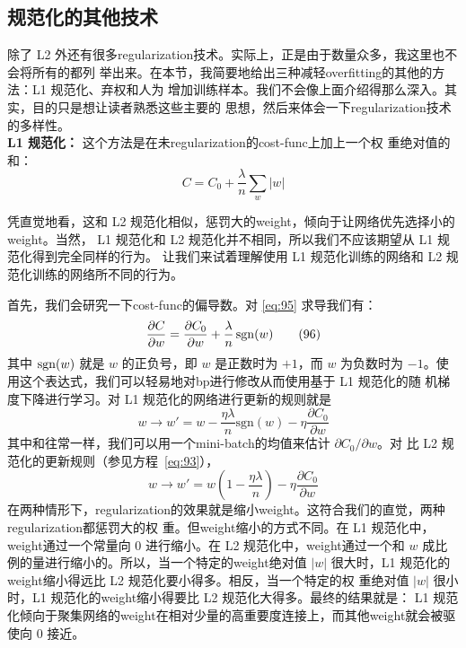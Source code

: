 \subsection{规范化的其他技术}

除了 L2 外还有很多\gls*{regularization}技术。实际上，正是由于数量众多，我这里也不会将所有的都列
举出来。在本节，我简要地给出三种减轻\gls*{overfitting}的其他的方法：L1 规范化、弃权和人为
增加训练样本。我们不会像上面介绍得那么深入。其实，目的只是想让读者熟悉这些主要的
思想，然后来体会一下\gls*{regularization}技术的多样性。\\

\textbf{L1 规范化：} 这个方法是在未\gls*{regularization}的\gls*{cost-func}上加上一个权
重绝对值的和：
\begin{equation}
  C = C_0 + \frac{\lambda}{n} \sum_w |w|
  \label{eq:95}\tag{95}
\end{equation}

凭直觉地看，这和 L2 规范化相似，惩罚大的\gls*{weight}，倾向于让网络优先选择小的\gls*{weight}。当然，
L1 规范化和 L2 规范化并不相同，所以我们不应该期望从 L1 规范化得到完全同样的行为。
让我们来试着理解使用 L1 规范化训练的网络和 L2 规范化训练的网络所不同的行为。

首先，我们会研究一下\gls*{cost-func}的偏导数。对 \eqref{eq:95} 求导我们有：
\begin{equation}
  \frac{\partial C}{\partial w} = \frac{\partial C_0}{\partial w}
  + \frac{\lambda}{n} \, {\rm sgn}(w)
  \label{eq:96}\tag{96}
\end{equation}
其中 ${\rm sgn}(w)$ 就是 $w$ 的正负号，即 $w$ 是正数时为 $+1$，而 $w$ 为负数时为
$-1$。使用这个表达式，我们可以轻易地对\gls*{bp}进行修改从而使用基于 L1 规范化的随
机梯度下降进行学习。对 L1 规范化的网络进行更新的规则就是
\begin{equation}
  w \rightarrow w' = w-\frac{\eta \lambda}{n} \mbox{sgn}(w) - \eta \frac{\partial
  C_0}{\partial w}
  \label{eq:97}\tag{97}
\end{equation}
其中和往常一样，我们可以用一个\gls*{mini-batch}的均值来估计 $\partial C_0/\partial w$。对
比 L2 规范化的更新规则（参见方程~\eqref{eq:93}），
\begin{equation}
  w \rightarrow w' = w\left(1 - \frac{\eta \lambda}{n} \right)
  - \eta \frac{\partial C_0}{\partial w}
  \label{eq:98}\tag{98}
\end{equation}
在两种情形下，\gls*{regularization}的效果就是缩小\gls*{weight}。这符合我们的直觉，两种\gls*{regularization}都惩罚大的权
重。但\gls*{weight}缩小的方式不同。在 L1 规范化中，\gls*{weight}通过一个常量向 $0$ 进行缩小。在 L2
规范化中，\gls*{weight}通过一个和 $w$ 成比例的量进行缩小的。所以，当一个特定的\gls*{weight}绝对值
$|w|$ 很大时，L1 规范化的\gls*{weight}缩小得远比 L2 规范化要小得多。相反，当一个特定的权
重绝对值 $|w|$ 很小时，L1 规范化的\gls*{weight}缩小得要比 L2 规范化大得多。最终的结果就是：
L1 规范化倾向于聚集网络的\gls*{weight}在相对少量的高重要度连接上，而其他\gls*{weight}就会被驱使向
$0$ 接近。

